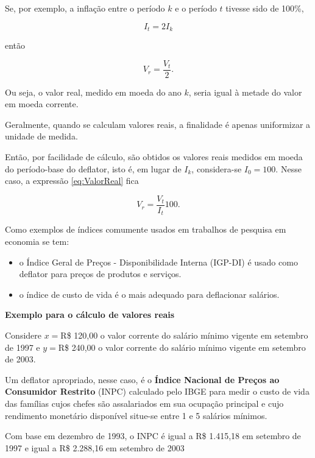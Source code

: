 \documentclass[
]{book}
\begin{document}
Se, por exemplo, a inflação entre o período \(k\) e o período \(t\) tivesse sido de 100\%,

\begin{equation}
  I_t = 2I_k
\end{equation}

então

\begin{equation}
  V_r = \frac{V_t}{2}.
\end{equation}

Ou seja, o valor real, medido em moeda do ano \(k\), seria igual à metade do valor em moeda corrente.

Geralmente, quando se calculam valores reais, a finalidade é apenas uniformizar a unidade de medida.

Então, por facilidade de cálculo, são obtidos os valores reais medidos em moeda do período-base do deflator, isto é, em lugar de \(I_k\), considera-se \(I_0 = 100\). Nesse caso, a expressão \eqref{eq:ValorReal} fica

\begin{equation}
  V_r = \frac{V_t}{I_t}100.
  \label{eq:ValorRealEmPorcentagem}
\end{equation}

Como exemplos de índices comumente usados em trabalhos de pesquisa em economia se tem:

\begin{itemize}
\item
  o Índice Geral de Preços - Disponibilidade Interna (IGP-DI) é usado como deflator para preços de produtos e serviços.
\item
  o índice de custo de vida é o mais adequado para deflacionar salários.
\end{itemize}

\textbf{Exemplo para o cálculo de valores reais}

Considere \(x=\)R\$ 120,00 o valor corrente do salário mínimo vigente em setembro de 1997 e \(y=\)R\$ 240,00 o valor corrente do salário mínimo vigente em setembro de 2003.

Um deflator apropriado, nesse caso, é o \textbf{Índice Nacional de Preços ao Consumidor Restrito} (INPC) calculado pelo IBGE para medir o custo de vida das famílias cujos chefes são assalariados em sua ocupação principal e cujo rendimento monetário disponível situe-se entre 1 e 5 salários mínimos.

Com base em dezembro de 1993, o INPC é igual a R\$ 1.415,18 em setembro de 1997 e igual a R\$ 2.288,16 em setembro de 2003
\end{document}
